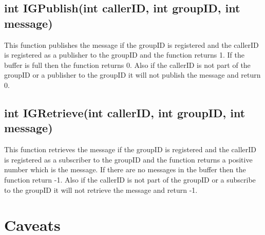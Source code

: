 \documentclass{article}
\begin{document}
\subsection{int IGPublish(int callerID, int groupID, int message)}
This function publishes the message if the groupID is registered and the callerID is registered as a publisher to the groupID and the function returns 1. If the buffer is full then the function returns 0. Also if the callerID is not part of the groupID or a publisher to the groupID it will not publish the message and return 0.

\subsection{int IGRetrieve(int callerID, int groupID, int message)}
This function retrieves the message if the groupID is registered and the callerID is registered as a subscriber to the groupID and the function returns a positive number which is the message. If there are no messages in the buffer then the function return -1. Also if the callerID is not part of the groupID or a subscribe to the groupID it will not retrieve the message and return -1.


\section{Caveats}
\end{document}
